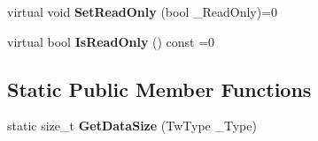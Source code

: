 \begin{DoxyCompactItemize}
\item 
\hypertarget{struct_c_tw_var_a285b8db97def5cca7593d7cc373629e1}{virtual void {\bfseries Set\+Read\+Only} (bool \+\_\+\+Read\+Only)=0}\label{struct_c_tw_var_a285b8db97def5cca7593d7cc373629e1}

\item 
\hypertarget{struct_c_tw_var_a3e15477b5954f28bcaa630c013512d62}{virtual bool {\bfseries Is\+Read\+Only} () const =0}\label{struct_c_tw_var_a3e15477b5954f28bcaa630c013512d62}

\end{DoxyCompactItemize}
\subsection*{Static Public Member Functions}
\begin{DoxyCompactItemize}
\item 
\hypertarget{struct_c_tw_var_ac2b2d19245a4c1210e2d3a8571ba627b}{static size\+\_\+t {\bfseries Get\+Data\+Size} (Tw\+Type \+\_\+\+Type)}\label{struct_c_tw_var_ac2b2d19245a4c1210e2d3a8571ba627b}

\end{DoxyCompactItemize}
